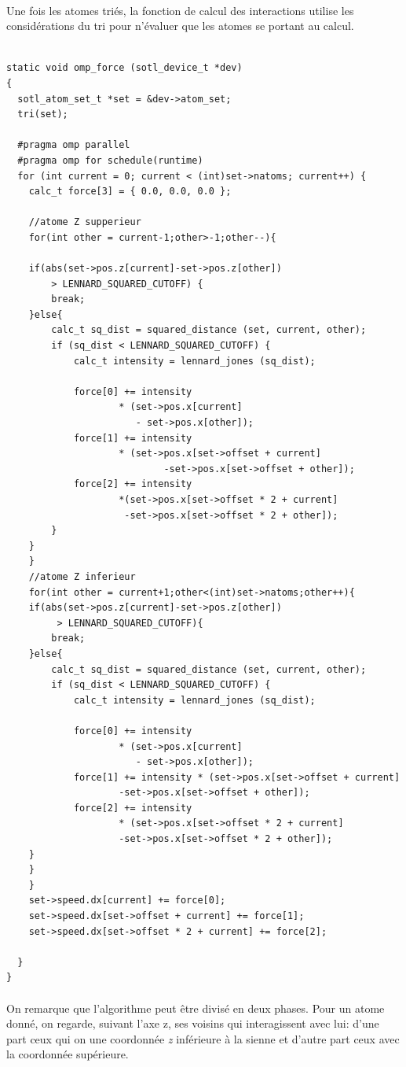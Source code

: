 \documentclass[a4paper,11pt]{report}
\begin{document}
\paragraph{}
Une fois les atomes triés, la fonction de calcul des interactions utilise les considérations du tri pour n'évaluer que les 
atomes se portant au calcul.
\newline 
\begin{lstlisting}[style=CStyle]

static void omp_force (sotl_device_t *dev)
{
  sotl_atom_set_t *set = &dev->atom_set;
  tri(set);

  #pragma omp parallel 
  #pragma omp for schedule(runtime)
  for (int current = 0; current < (int)set->natoms; current++) {
    calc_t force[3] = { 0.0, 0.0, 0.0 };

    //atome Z supperieur
    for(int other = current-1;other>-1;other--){
		
	if(abs(set->pos.z[current]-set->pos.z[other]) 
	  	> LENNARD_SQUARED_CUTOFF) {
		break;
	}else{
		calc_t sq_dist = squared_distance (set, current, other);
		if (sq_dist < LENNARD_SQUARED_CUTOFF) {
	  		calc_t intensity = lennard_jones (sq_dist);

	  		force[0] += intensity 
					* (set->pos.x[current] 
					   - set->pos.x[other]);
	  		force[1] += intensity 
					* (set->pos.x[set->offset + current]
				            -set->pos.x[set->offset + other]);
	 		force[2] += intensity 
					*(set->pos.x[set->offset * 2 + current] 
				   	 -set->pos.x[set->offset * 2 + other]);
		}
	}
    }
    //atome Z inferieur
    for(int other = current+1;other<(int)set->natoms;other++){
	if(abs(set->pos.z[current]-set->pos.z[other])
		 > LENNARD_SQUARED_CUTOFF){
		break;
	}else{
		calc_t sq_dist = squared_distance (set, current, other);
		if (sq_dist < LENNARD_SQUARED_CUTOFF) {
	  		calc_t intensity = lennard_jones (sq_dist);

	  		force[0] += intensity 
					* (set->pos.x[current] 
					   - set->pos.x[other]);
		  	force[1] += intensity * (set->pos.x[set->offset + current] 
				   	-set->pos.x[set->offset + other]);
			force[2] += intensity 
					* (set->pos.x[set->offset * 2 + current] 
					-set->pos.x[set->offset * 2 + other]);
	}
	}
    }
    set->speed.dx[current] += force[0];
    set->speed.dx[set->offset + current] += force[1];
    set->speed.dx[set->offset * 2 + current] += force[2];
	
  }
}
\end{lstlisting}
\paragraph{}
On remarque que l'algorithme peut être divisé en deux phases. Pour un atome donné, on regarde, suivant l'axe z, ses voisins qui interagissent avec lui: d'une part ceux qui on une coordonnée \textit{z} inférieure à la sienne et d'autre  part ceux avec la coordonnée supérieure.
\end{document}
